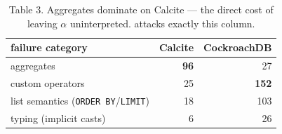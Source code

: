 \begin{table}[h]\centering\small
\begin{tabular}{@{}lrr@{}}
\toprule
failure category & Calcite & CockroachDB\\
\midrule
aggregates        & \textbf{96} & 27\\
custom operators  & 25 & \textbf{152}\\
list semantics (\lstinline|ORDER BY|/\lstinline|LIMIT|) & 18 & 103\\
typing (implicit casts) & 6 & 26\\
\bottomrule
\end{tabular}
\caption{\cite{qed} Table 3. Aggregates dominate on Calcite --- the direct cost of leaving
$\alpha$ uninterpreted. \sqlsolver{} attacks exactly this column.}
\end{table}
